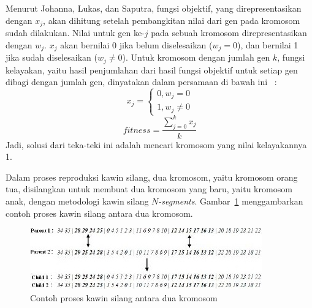 Menurut Johanna, Lukas, dan Saputra, fungsi objektif, yang direpresentasikan dengan \begin{math}x_j\end{math}, akan dihitung setelah pembangkitan nilai dari gen pada kromosom sudah dilakukan. Nilai untuk gen ke-\begin{math}j\end{math} pada sebuah kromosom direpresentasikan dengan \begin{math}w_j\end{math}. \begin{math}x_j\end{math} akan bernilai 0 jika belum diselesaikan (\begin{math}w_j = 0\end{math}), dan bernilai 1 jika sudah diselesaikan (\begin{math}w_j \neq 0\end{math}). Untuk kromosom dengan jumlah gen \begin{math}k\end{math}, fungsi kelayakan, yaitu hasil penjumlahan dari hasil fungsi objektif untuk setiap gen dibagi dengan jumlah gen, dinyatakan dalam persamaan di bawah ini ~\cite{johanna:12:hybrid}:
\begin{displaymath}
x_j = 
\begin{cases}
0, w_j = 0 \\
1, w_j \neq 0
\end{cases}
\end{displaymath}
\begin{displaymath}
fitness = \frac{\sum_{j=0}^k x_j}{k}
\end{displaymath}
Jadi, solusi dari teka-teki ini adalah mencari kromosom yang nilai kelayakannya 1.

Dalam proses reproduksi kawin silang, dua kromosom, yaitu kromosom orang tua, disilangkan untuk membuat dua kromosom yang baru, yaitu kromosom anak, dengan metodologi kawin silang \textit{\begin{math}N\end{math}-segments}. Gambar~\ref{fig:hybrid9} menggambarkan contoh proses kawin silang antara dua kromosom.

\begin{figure}
\centering
\captionsetup{justification=centering}
\includegraphics[scale=1]{Gambar/HybridGenetic9}
\caption[Contoh proses kawin silang antara dua kromosom ~\cite{johanna:12:hybrid}]{Contoh proses kawin silang antara dua kromosom ~\cite{johanna:12:hybrid}}
\label{fig:hybrid9}
\end{figure}

